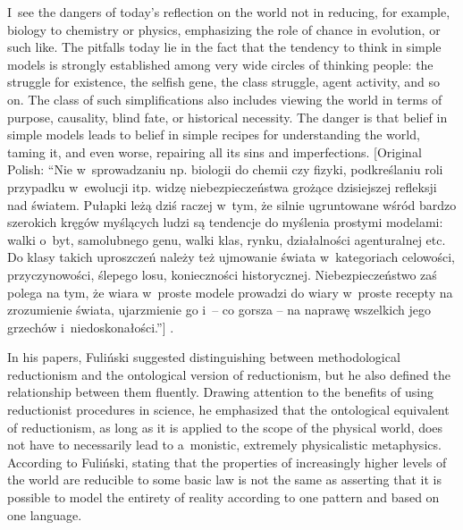 I~see the dangers of today's reflection on the world not in reducing, for example, biology to chemistry or physics, emphasizing the role of chance in evolution, or such like. The pitfalls today lie in the fact that the tendency to think in simple models is strongly established among very wide circles of thinking people: the struggle for existence, the selfish gene, the class struggle, agent activity, and so on. The class of such simplifications also includes viewing the world in terms of purpose, causality, blind fate, or historical necessity. The danger is that belief in simple models leads to belief in simple recipes for understanding the world, taming it, and even worse, repairing all its sins and imperfections. [Original Polish: ``Nie w~sprowadzaniu np. biologii do chemii czy fizyki, podkreślaniu roli przypadku w~ewolucji itp. widzę niebezpieczeństwa grożące dzisiejszej refleksji nad światem. Pułapki leżą dziś raczej w~tym, że silnie ugruntowane wśród bardzo szerokich kręgów myślących ludzi są tendencje do myślenia prostymi modelami: walki o~byt, samolubnego genu, walki klas, rynku, działalności agenturalnej etc. Do klasy takich uproszczeń należy też ujmowanie świata w~kategoriach celowości, przyczynowości, ślepego losu, konieczności historycznej. Niebezpieczeństwo zaś polega na tym, że wiara w~proste modele prowadzi do wiary w~proste recepty na zrozumienie świata, ujarzmienie go i~-- co gorsza -- na naprawę wszelkich jego grzechów i~niedoskonałości.''] 
\parencite[][p.230]{fulinski_maszyna_1989}.%




In his papers, Fuliński suggested distinguishing between methodological reductionism and the ontological version of reductionism, but he also defined the relationship between them fluently. Drawing attention to the benefits of using reductionist procedures in science, he emphasized that the ontological equivalent of reductionism, as long as it is applied to the scope of the physical world, does not have to necessarily lead to a~monistic, extremely physicalistic metaphysics. According to Fuliński, stating that the properties of increasingly higher levels of the world are reducible to some basic law is not the same as asserting that it is possible to model the entirety of reality according to one pattern and based on one language.



